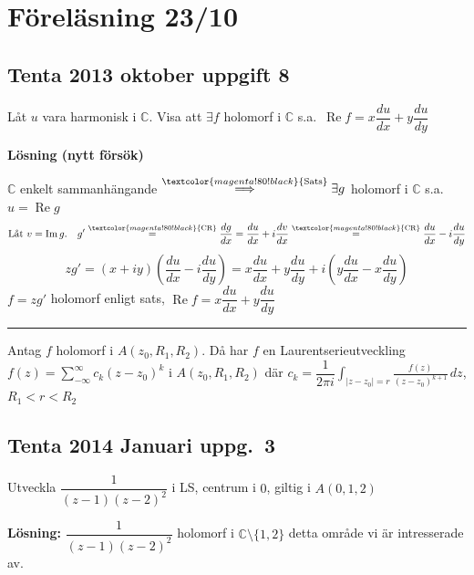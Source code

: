 \section{Föreläsning 23/10}
\subsection{Tenta 2013 oktober uppgift 8}
Låt $u$ vara harmonisk i $\mathbb{C}$. Visa att $\exists f$ holomorf i $\mathbb{C}$ s.a.\ $\operatorname{Re} f = x\dfrac{du}{dx} + y\dfrac{du}{dy}$

\textbf{Lösning (nytt försök)}

$\mathbb{C}$ enkelt sammanhängande $\overset{\textcolor{magenta!80!black}{\text{Sats}}}{\Longrightarrow} \exists g$ holomorf i $\mathbb{C}$ s.a.\ $u = \operatorname{Re} g$
\[ \text{Låt } v = \operatorname{Im} g. \quad g' \overset{\textcolor{magenta!80!black}{\text{CR}}}{=} \frac{dg}{dx} = \frac{du}{dx} + i\frac{dv}{dx} \overset{\textcolor{magenta!80!black}{\text{CR}}}{=} \frac{du}{dx} - i\frac{du}{dy} \]
\[ zg' = (x + iy)\left( \frac{du}{dx} - i\frac{du}{dy} \right) = x\frac{du}{dx} + y\frac{du}{dy} + i\left( y\frac{du}{dx} - x\frac{du}{dy} \right) \]
$f = zg'$ holomorf enligt sats, $\operatorname{Re} f = x\dfrac{du}{dx} + y\dfrac{du}{dy}$

\noindent\rule{\linewidth}{0.4pt}

\begin{theorem}
Antag $f$ holomorf i $A(z_0, R_1, R_2)$. Då har $f$ en Laurentserieutveckling $f(z) = \sum_{-\infty}^\infty c_k(z - z_0)^k$ i $A(z_0, R_1, R_2)$ där $c_k = \dfrac{1}{2\pi i} \displaystyle\int_{|z - z_0| = r} \frac{f(z)}{(z - z_0)^{k+1}}\,dz$, $R_1 < r < R_2$
\end{theorem}

\subsection{Tenta 2014 Januari uppg.\ 3}
Utveckla $\dfrac{1}{(z - 1)(z - 2)^2}$ i LS, centrum i $0$, giltig i $A(0, 1, 2)$

\textbf{Lösning:} $\dfrac{1}{(z - 1)(z - 2)^2}$ holomorf i $\mathbb{C} \setminus \{1, 2\}$
\textcolor{red!70!black}{detta område vi är intresserade av.}

